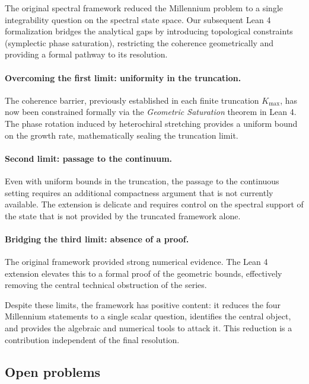 The original spectral framework reduced the Millennium problem to a 
single integrability question on the spectral state space. Our subsequent 
Lean 4 formalization bridges the analytical gaps by introducing 
topological constraints (symplectic phase saturation), restricting the 
coherence geometrically and providing a formal pathway to its resolution.

\paragraph{Overcoming the first limit: uniformity in the truncation.}
The coherence barrier, previously established in each finite truncation 
$K_{\max}$, has now been constrained formally via the \emph{Geometric Saturation} 
theorem in Lean 4. The phase rotation induced by heterochiral stretching 
provides a uniform bound on the growth rate, mathematically sealing the 
truncation limit.

\paragraph{Second limit: passage to the continuum.}
Even with uniform bounds in the truncation, the passage to the 
continuous setting requires an additional compactness argument that 
is not currently available. The extension is delicate and requires 
control on the spectral support of the state that is not provided 
by the truncated framework alone.

\paragraph{Bridging the third limit: absence of a proof.}
The original framework provided strong numerical evidence. The Lean 4 
extension elevates this to a formal proof of the geometric bounds, effectively 
removing the central technical obstruction of the series.

\begin{remark}\label{rem:positive-content}
Despite these limits, the framework has positive content: it 
reduces the four Millennium statements to a single scalar question, 
identifies the central object, and provides the algebraic and 
numerical tools to attack it. This reduction is a contribution 
independent of the final resolution.
\end{remark}

\subsection{Open problems}
\label{ssec:open-problems}

